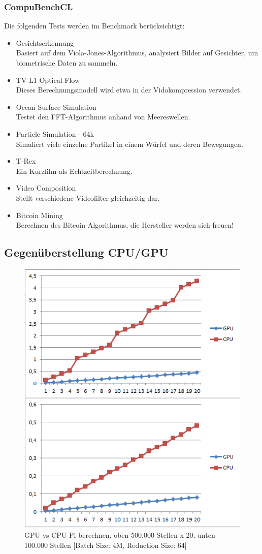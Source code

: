 \documentclass[letterpaper, 12pt]{article}
\let\tempsubsection\subsection
\renewcommand\subsection[1]{\vspace{0cm}\tempsubsection{#1}\vspace{0cm}}
\let\tempsubsubsection\subsubsection
\renewcommand\subsubsection[1]{\vspace{0cm}\tempsubsubsection{#1}\vspace{0cm}}
\begin{document}
\subsubsection{CompuBenchCL}
Die folgenden Tests werden im Benchmark berücksichtigt:
\begin{itemize}
	\item Gesichtserkennung \\
	Basiert auf dem Viola-Jones-Algorithmus, analysiert Bilder auf Gesichter, um biometrische Daten zu sammeln.
	\item  TV-L1 Optical Flow \\
	Dieses Berechnungsmodell wird etwa in der Vidokompression verwendet.
	\item Ocean Surface Simulation \\
	Testet den FFT-Algorithmus anhand von Meereswellen.
	\item Particle Simulation - 64k \\
	Simuliert viele einzelne Partikel in einem Würfel und deren Bewegungen.
	\item T-Rex \\
	Ein Kurzfilm als Echtzeitberechnung.
	\item Video Composition \\
	Stellt verschiedene Videofilter gleichzeitig dar.
	\item Bitcoin Mining \\
	Berechnen des Bitcoin-Algorithmus, die Hersteller werden sich freuen!
\end{itemize}

\newpage

\subsection{Gegenüberstellung CPU/GPU}
\begin{figure}[!h]
	\begin{center}
		\includegraphics[width=0.5\linewidth]{images/ergebnis}
		\caption{GPU vs CPU Pi berechnen, oben 500.000 Stellen x 20, unten 100.000 Stellen [Batch Size: 4M, Reduction Size: 64]}
		\label{Angabe}
	\end{center}
\end{figure}
\end{document}
